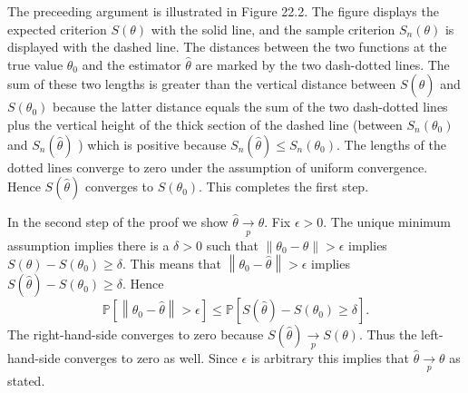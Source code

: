 \documentclass[10pt]{article}
\begin{document}
The preceeding argument is illustrated in Figure 22.2. The figure displays the expected criterion $S(\theta)$ with the solid line, and the sample criterion $S_{n}(\theta)$ is displayed with the dashed line. The distances between the two functions at the true value $\theta_{0}$ and the estimator $\hat{\theta}$ are marked by the two dash-dotted lines. The sum of these two lengths is greater than the vertical distance between $S(\widehat{\theta})$ and $S\left(\theta_{0}\right)$ because the latter distance equals the sum of the two dash-dotted lines plus the vertical height of the thick section of the dashed line (between $S_{n}\left(\theta_{0}\right)$ and $S_{n}(\widehat{\theta})$ ) which is positive because $S_{n}(\widehat{\theta}) \leq S_{n}\left(\theta_{0}\right)$. The lengths of the dotted lines converge to zero under the assumption of uniform convergence. Hence $S(\widehat{\theta})$ converges to $S\left(\theta_{0}\right)$. This completes the first step.

In the second step of the proof we show $\widehat{\theta} \underset{p}{\rightarrow} \theta$. Fix $\epsilon>0$. The unique minimum assumption implies there is a $\delta>0$ such that $\left\|\theta_{0}-\theta\right\|>\epsilon$ implies $S(\theta)-S\left(\theta_{0}\right) \geq \delta$. This means that $\left\|\theta_{0}-\widehat{\theta}\right\|>\epsilon$ implies $S(\widehat{\theta})-S\left(\theta_{0}\right) \geq \delta$. Hence
$$
\mathbb{P}\left[\left\|\theta_{0}-\widehat{\theta}\right\|>\epsilon\right] \leq \mathbb{P}\left[S(\widehat{\theta})-S\left(\theta_{0}\right) \geq \delta\right] .
$$
The right-hand-side converges to zero because $S(\widehat{\theta}) \underset{p}{\rightarrow} S(\theta)$. Thus the left-hand-side converges to zero as well. Since $\epsilon$ is arbitrary this implies that $\hat{\theta} \underset{p}{\rightarrow} \theta$ as stated.
\end{document}
